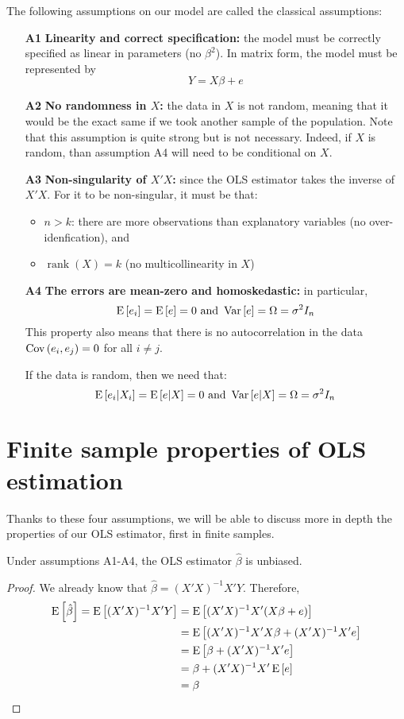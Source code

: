 \begin{definition}
The following assumptions on our model are called the classical assumptions:
\begin{itemize}
\item[\textbf{A1}]\textbf{Linearity and correct specification:} the model must be correctly specified as linear in parameters (no $\beta^2$). In matrix form, the model must be represented by $$Y = X\beta + e$$
\item[\textbf{A2}]\textbf{No randomness in $X$:} the data in $X$ is not random, meaning that it would be the exact same if we took another sample of the population. Note that this assumption is quite strong but is not necessary. Indeed, if $X$ is random, than assumption A4 will need to be conditional on $X$.
\item[\textbf{A3}]\textbf{Non-singularity of $X'X$:} since the OLS estimator takes the inverse of $X'X$. For it to be non-singular, it must be that:\begin{itemize}
\item $n>k$: there are more observations than explanatory variables (no over-idenfication), and
\item $\operatorname{rank}(X) = k$ (no multicollinearity in $X$)
\end{itemize}
\item[\textbf{A4}]\textbf{The errors are mean-zero and homoskedastic:} in particular, $$ \operatorname{E}\left[e_i\right] = \operatorname{E}\left[e\right] = 0 \text{ and } \operatorname{Var}\left[e\right] = \Omega = \sigma^2I_n $$
This property also means that there is no autocorrelation in the data $\operatorname{Cov}\left(e_i, e_j\right) = 0$ for all $i\neq j$.

If the data is random, then we need that: $$ \operatorname{E}\left[e_i|X_i\right] = \operatorname{E}\left[e|X\right] = 0 \text{ and } \operatorname{Var}\left[e|X\right] = \Omega = \sigma^2I_n $$
\end{itemize}
\end{definition}


\section{Finite sample properties of OLS estimation}
Thanks to these four assumptions, we will be able to discuss more in depth the properties of our OLS estimator, first in finite samples.

\begin{proposition}
Under assumptions A1-A4, the OLS estimator $\hat\beta$ is unbiased.
\end{proposition}
\begin{proof}
We already know that $\hat\beta = (X'X)^{-1}X'Y$. Therefore, \begin{align*}
\operatorname{E}\left[\hat\beta\right] = \operatorname{E}\left[(X'X)^{-1}X'Y\right] & = \operatorname{E}\left[(X'X)^{-1}X'(X\beta + e)\right]\\
& = \operatorname{E}\left[(X'X)^{-1}X'X\beta + (X'X)^{-1}X'e\right]\\
& = \operatorname{E}\left[\beta + (X'X)^{-1}X'e\right]\\
& = \beta + (X'X)^{-1}X'\operatorname{E}\left[e\right]\\
& = \beta
\end{align*}
\end{proof}

